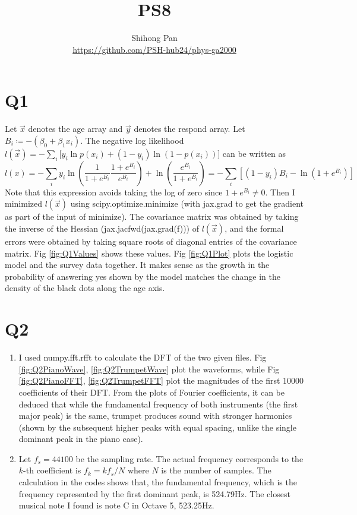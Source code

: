 \documentclass[11pt]{article}
\title{PS8}
\author{Shihong Pan\\ \url{https://github.com/PSH-hub24/phys-ga2000}}
\begin{document}
\maketitle

\section*{Q1}
Let $\Vec{x}$ denotes the age array and $\Vec{y}$ denotes the respond array. Let $B_i\coloneqq -(\beta_0+\beta_1x_i)$. The negative log likelihood $l(\Vec{x})=-\sum_i [y_i\ln{p(x_i)+(1-y_i)\ln(1-p(x_i))]}$ can be written as
\begin{equation}
    l(x)=-\sum_i y_i\ln(\frac{1}{1+e^{B_i}}\frac{1+e^{B_i}}{e^{B_i}})+\ln(\frac{e^{B_i}}{1+e^{B_i}})=-\sum_i [(1-y_i)B_i-\ln(1+e^{B_i})]
\end{equation}
Note that this expression avoids taking the log of zero since $1+e^{B_i}\neq0$. Then I minimized $l(\Vec{x})$ using scipy.optimize.minimize (with jax.grad to get the gradient as part of the input of minimize). The covariance matrix was obtained by taking the inverse of the Hessian (jax.jacfwd(jax.grad(f))) of $l(\Vec{x})$, and the formal errors were obtained by taking square roots of diagonal entries of the covariance matrix. Fig \ref{fig:Q1Values} shows these values. Fig \ref{fig:Q1Plot} plots the logistic model and the survey data together. It makes sense as the growth in the probability of answering yes shown by the model matches the change in the density of the black dots along the age axis.

\section*{Q2}
\begin{enumerate}[label=\alph*)]
    \item I used numpy.fft.rfft to calculate the DFT of the two given files. Fig \ref{fig:Q2PianoWave}, \ref{fig:Q2TrumpetWave} plot the waveforms, while Fig \ref{fig:Q2PianoFFT}, \ref{fig:Q2TrumpetFFT} plot the magnitudes of the first 10000 coefficients of their DFT. From the plots of Fourier coefficients, it can be deduced that while the fundamental frequency of both instruments (the first major peak) is the same, trumpet produces sound with stronger harmonics (shown by the subsequent higher peaks with equal spacing, unlike the single dominant peak in the piano case).
    \item Let $f_s=44100$ be the sampling rate. The actual frequency corresponds to the $k$-th coefficient is $f_k=kf_s/N$ where $N$ is the number of samples. The calculation in the codes shows that, the fundamental frequency, which is the frequency represented by the first dominant peak, is 524.79Hz. The closest musical note I found is note C in Octave 5, 523.25Hz.
\end{enumerate}
\end{document}
